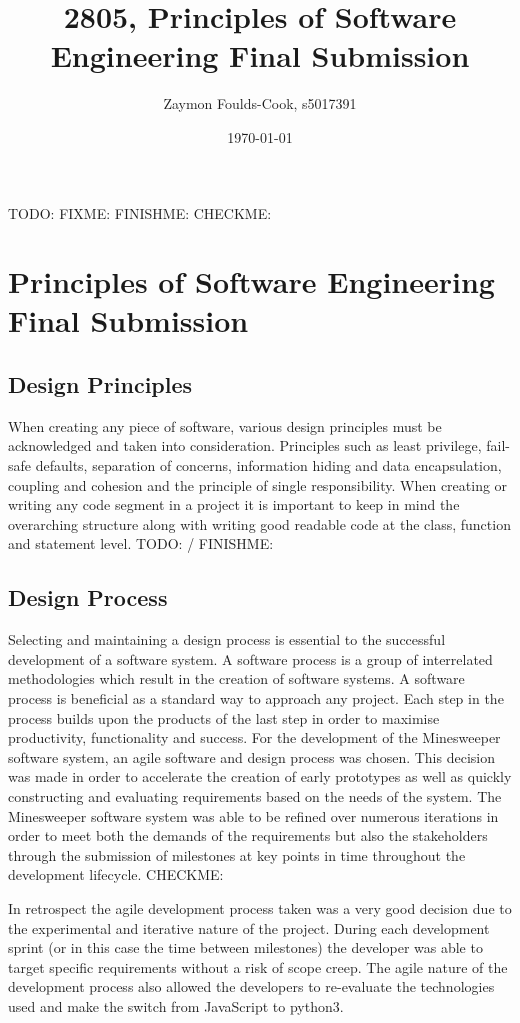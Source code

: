 \documentclass[12pt, a4]{report}
\title{2805, Principles of Software Engineering Final Submission}
\author{Zaymon Foulds-Cook, s5017391}%
\date{\today}
\begin{document}
\begin{titlepage}
	\maketitle
\end{titlepage}

\tableofcontents
\pagebreak

TODO: FIXME: FINISHME: CHECKME:

%
%
\section{Principles of Software Engineering Final Submission}
\subsection{Design Principles}
When creating any piece of software, various design principles must be acknowledged and taken into consideration. Principles such as least privilege, fail-safe defaults, separation of concerns, information hiding and data encapsulation, coupling and cohesion and the principle of single responsibility. When creating or writing any code segment in a project it is important to keep in mind the overarching structure along with writing good readable code at the class, function and statement level.
TODO: / FINISHME:

%
%
\subsection{Design Process}
Selecting and maintaining a design process is essential to the successful development of a software system. A software process is a group of interrelated methodologies which result in the creation of software systems. A software process is beneficial as a standard way to approach any project. Each step in the process builds upon the products of the last step in order to maximise productivity, functionality and success. For the development of the Minesweeper software system, an agile software and design process was chosen. This decision was made in order to accelerate the creation of early prototypes as well as quickly constructing and evaluating requirements based on the needs of the system. The Minesweeper software system was able to be refined over numerous iterations in order to meet both the demands of the requirements but also the stakeholders through the submission of milestones at key points in time throughout the development lifecycle. 
\newline
CHECKME:
\par In retrospect the agile development process taken was a very good decision due to the experimental and iterative nature of the project. During each development sprint (or in this case the time between milestones) the developer was able to target specific requirements without a risk of scope creep. The agile nature of the development process also allowed the developers to re-evaluate the technologies used and make the switch from JavaScript to python3.
\end{document}
